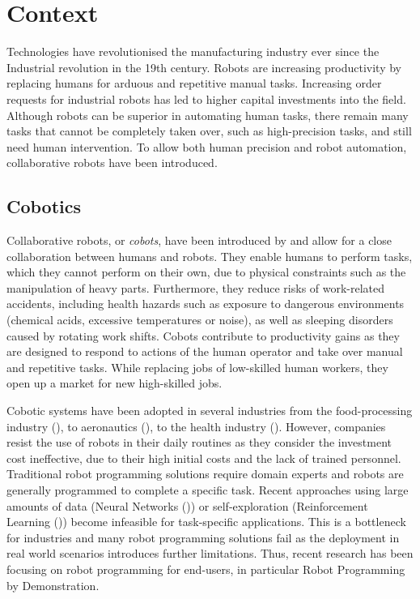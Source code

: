 \section{Context}
Technologies have revolutionised the manufacturing industry ever since the Industrial revolution in the 19th century.
Robots are increasing productivity by replacing humans for arduous and repetitive manual tasks.
Increasing order requests for industrial robots has led to higher capital investments into the field.
Although robots can be superior in automating human tasks, there remain many tasks that cannot be completely taken over, such as high-precision tasks, and still need human intervention.
To allow both human precision and robot automation, collaborative robots have been introduced.

\subsection{Cobotics}\label{subsec:Cobotics}
Collaborative robots, or \textit{cobots}, have been introduced by \cite{colgate1999cobots} and allow for a close collaboration between humans and robots.
They enable humans to perform tasks, which they cannot perform on their own, due to physical constraints such as the manipulation of heavy parts.
Furthermore, they reduce risks of work-related accidents, including health hazards such as exposure to dangerous environments (\eg chemical acids, excessive temperatures or noise), as well as sleeping disorders caused by rotating work shifts.
Cobots contribute to productivity gains as they are designed to respond to actions of the human operator and take over manual and repetitive tasks.
While replacing jobs of low-skilled human workers, they open up a market for new high-skilled jobs.

Cobotic systems have been adopted in several industries from the food-processing industry (\cite{Food}), to aeronautics (\cite{Airbus}), to the health industry (\cite{Ebola}).
However, companies resist the use of robots in their daily routines as they consider the investment cost ineffective, due to their high initial costs and the lack of trained personnel.
Traditional robot programming solutions require domain experts and robots are generally programmed to complete a specific task.
Recent approaches using large amounts of data (\eg Neural Networks (\cite{billard2001robust})) or self-exploration (\eg Reinforcement Learning (\cite{smart2002effective})) become infeasible for task-specific applications.
This is a bottleneck for industries and many robot programming solutions fail as the deployment in real world scenarios introduces further limitations. 
Thus, recent research has been focusing on robot programming for end-users, in particular Robot Programming by Demonstration.

